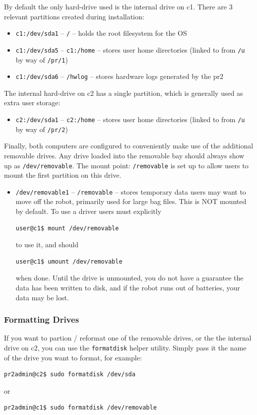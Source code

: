 By default the only hard-drive used is the internal drive on c1.
There are 3 relevant partitions created during installation:
\begin{itemize}
\item \texttt{c1:/dev/sda1} -- \texttt{/} -- holds the root filesystem
  for the OS
\item \texttt{c1:/dev/sda5} -- \texttt{c1:/home} -- stores user home
  directories (linked to from \texttt{/u} by way of \texttt{/pr/1})
\item \texttt{c1:/dev/sda6} -- \texttt{/hwlog} -- stores hardware logs
  generated by the pr2
\end{itemize}

The internal hard-drive on c2 has a single partition, which is
generally used as extra user storage:
\begin{itemize}
\item \texttt{c2:/dev/sda1} -- \texttt{c2:/home} -- stores user home
  directories (linked to from \texttt{/u} by way of \texttt{/pr/2})
\end{itemize}

Finally, both computers are configured to conveniently make use of the
additional removable drives.  Any drive loaded into the removable bay
should always show up as \texttt{/dev/removable}.  The mount point:
\texttt{/removable} is set up to allow users to mount the first
partition on this drive.
\begin{itemize}
\item \texttt{/dev/removable1} -- \texttt{/removable} -- stores
  temporary data users may want to move off the robot, primarily used
  for large bag files.  This is NOT mounted by default.  To use a
  driver users must explicitly
\begin{verbatim}
user@c1$ mount /dev/removable
\end{verbatim}
to use it, and should 
\begin{verbatim}
user@c1$ umount /dev/removable
\end{verbatim}
when done.  Until the drive is unmounted, you do not have a guarantee
the data has been written to disk, and if the robot runs out of
batteries, your data may be lost.
\end{itemize}

\subsubsection{Formatting Drives}
If you want to partion / reformat one of the removable drives, or the
the internal drive on c2, you can use the \texttt{formatdisk} helper
utility.  Simply pass it the name of the drive you want to format, for
example:
\begin{verbatim}
pr2admin@c2$ sudo formatdisk /dev/sda
\end{verbatim}
or
\begin{verbatim}
pr2admin@c1$ sudo formatdisk /dev/removable
\end{verbatim}


